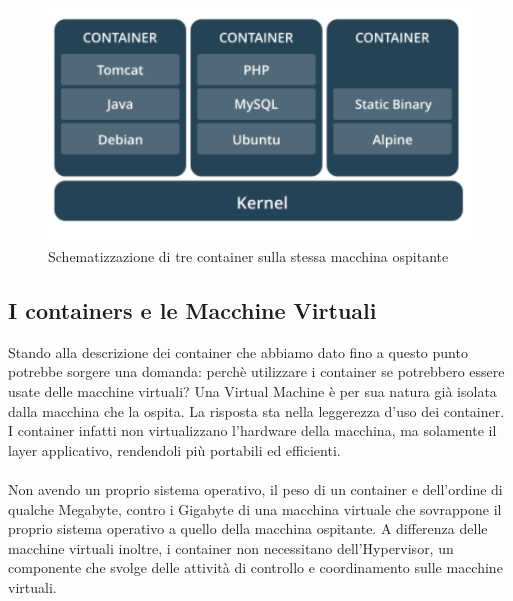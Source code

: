 \begin{figure}[h!]
	\centering
	\includegraphics[width=\textwidth,keepaspectratio=true]{capitoli/imgs/container.PNG}
	\caption{Schematizzazione di tre container sulla stessa macchina ospitante}
\end{figure}

\subsection{I containers e le Macchine Virtuali}
Stando alla descrizione dei container che abbiamo dato fino a questo punto potrebbe sorgere una domanda: perchè utilizzare i container se potrebbero essere usate delle macchine virtuali? Una Virtual Machine è per sua natura già isolata dalla macchina che la ospita. La risposta sta nella leggerezza d'uso dei container. I container infatti non virtualizzano l'hardware della macchina, ma solamente il layer applicativo, rendendoli più portabili ed efficienti.

\paragraph{}
Non avendo un proprio sistema operativo, il peso di un container e dell'ordine di qualche Megabyte, contro i Gigabyte di una macchina virtuale che sovrappone il proprio sistema operativo a quello della macchina ospitante. A differenza delle macchine virtuali inoltre, i container non necessitano dell'Hypervisor, un componente che svolge delle attività di controllo e coordinamento sulle macchine virtuali. 


